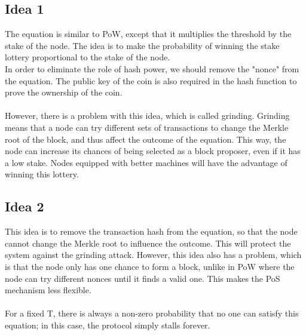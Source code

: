 \subsection{Idea 1}
The equation is similar to PoW, except that it multiplies the threshold by the stake of the node. The idea is to make the probability of winning the stake lottery proportional to the stake of the node.\\
In order to eliminate the role of hash power, we should remove the "nonce" from the equation. The public key of the coin is also required in the hash function to prove the ownership of the coin.\\\\
However, there is a problem with this idea, which is called grinding. Grinding means that a node can try different sets of transactions to change the Merkle root of the block, and thus affect the outcome of the equation. This way, the node can increase its chances of being selected as a block proposer, even if it has a low stake. Nodes equipped with better machines will have the advantage of winning this lottery.

\subsection*{Idea 2}
This idea is to remove the transaction hash from the equation, so that the node cannot change the Merkle root to influence the outcome. This will protect the system against the grinding attack.
However, this idea also has a problem, which is that the node only has one chance to form a block, unlike in PoW where the node can try different nonces until it finds a valid one. This makes the PoS mechanism less flexible.\\\\
For a fixed T, there is always a non-zero probability that no one can satisfy this equation; in this case, the protocol simply stalls forever.
